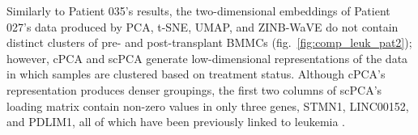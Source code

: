 Similarly to Patient 035's results, the two-dimensional embeddings of Patient 027's data produced by PCA, t-SNE, UMAP, and ZINB-WaVE do not contain distinct clusters of pre- and post-transplant BMMCs (fig.~\ref{fig:comp_leuk_pat2}); however, cPCA and scPCA generate low-dimensional representations of the data in which samples are clustered based on treatment status. Although cPCA's representation produces denser groupings, the first two columns of scPCA's loading matrix contain non-zero values in only three genes, STMN1, LINC00152, and PDLIM1, all of which have been previously linked to leukemia \cite{Machado-Neto2014,Zhang2019,Holleman2004}. 